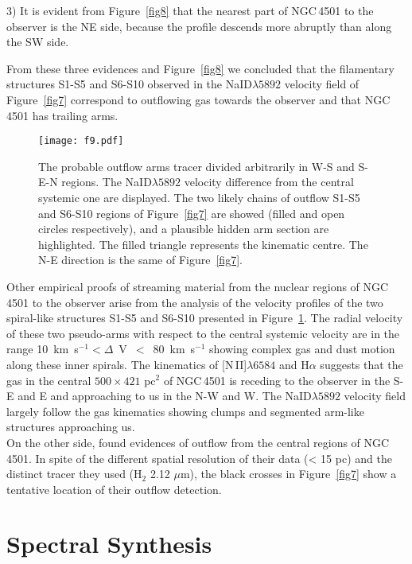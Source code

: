 \documentclass[fleqn,usenatbib]{mnras}
\begin{document}
3) It is evident from Figure~\ref{fig8} that the nearest part of NGC\,4501 to the observer is the NE side, because the profile descends more abruptly than along the SW side.

From these three evidences and Figure~\ref{fig8} we concluded that the filamentary structures S1-S5 and S6-S10 observed in the NaID$\lambda5892$ velocity field of 
Figure~\ref{fig7} correspond to outflowing gas towards the observer and that NGC\,4501 has trailing arms. 

\begin{figure}
\texttt{[image: f9.pdf]}
\caption{The probable outflow arms tracer divided arbitrarily in W-S and S-E-N regions.
 The NaID$\lambda5892$ velocity difference from the central systemic one are displayed. 
 The two likely chains of outflow S1-S5 and S6-S10 regions of Figure~\ref{fig7} are 
 showed (filled and open circles respectively), and a plausible hidden arm section are 
 highlighted. The filled triangle represents the kinematic centre. The N-E 
 direction is the same of Figure~\ref{fig7}.}
\label{fig9} 
\end{figure}

Other empirical proofs of streaming material from the nuclear regions of NGC\,4501 to the observer arise from the analysis of the velocity profiles of the two spiral-like
structures S1-S5 and S6-S10 presented in Figure~\ref{fig9}. The radial velocity of these two pseudo-arms with respect to the central systemic velocity are in the 
range \mbox{10 km s$^{-1} < \Delta$ V $<$ 80 km s$^{-1}$} showing complex gas and dust motion along these inner spirals. The kinematics of \hbox{[N\,II]$\lambda6584$} 
and H$\alpha$ suggests that the gas in the central $500 \times 421$ pc$^2$ of NGC\,4501 is receding to the observer in the S-E and E and approaching to us in the N-W and W. The 
NaID$\lambda5892$ velocity field largely follow the gas kinematics showing clumps and segmented arm-like structures approaching us.\\  
On the other side, \citet{Mazzalay2014} found evidences of outflow from the central regions of NGC\,4501. In spite of the different spatial resolution of their data 
(< 15 pc) and the distinct tracer they used (H$_2$ 2.12 $\mu$m), the black crosses in Figure~\ref{fig7} show a tentative location of 
their outflow detection.

\section{Spectral Synthesis}\label{sec:s7}
\end{document}
